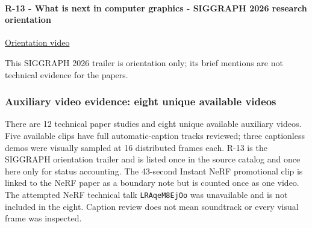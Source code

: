 \paragraph{R-13 - What is next in computer graphics - SIGGRAPH 2026 research orientation}\label{r-13---what-is-next-in-computer-graphics---siggraph-2026-research-orientation}

\href{https://www.youtube.com/watch?v=sIcGH3M5yPc}{Orientation video}

This SIGGRAPH 2026 trailer is orientation only; its brief mentions are not technical evidence for the papers.

\subsubsection{Auxiliary video evidence: eight unique available videos}\label{auxiliary-video-evidence-eight-unique-available-videos}

There are 12 technical paper studies and eight unique available auxiliary videos. Five available clips have full automatic-caption tracks reviewed; three captionless demos were visually sampled at 16 distributed frames each. R-13 is the SIGGRAPH orientation trailer and is listed once in the source catalog and once here only for status accounting. The 43-second Instant NeRF promotional clip is linked to the NeRF paper as a boundary note but is counted once as one video. The attempted NeRF technical talk \texttt{LRAqeM8EjOo} was unavailable and is not included in the eight. Caption review does not mean soundtrack or every visual frame was inspected.

